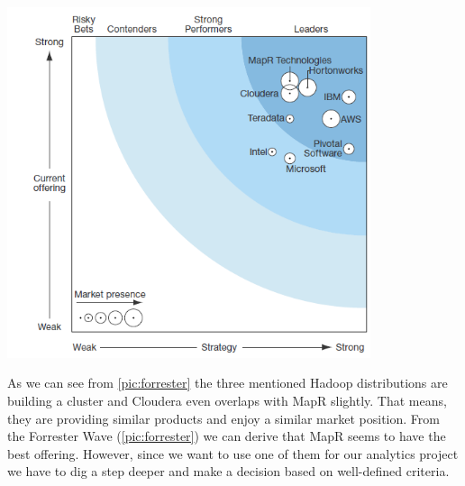 \begin{center}
\includegraphics[width=0.8\textwidth]{img/figure1}
\label{pic:forrester}
\end{center}
As we can see from 
\ref{pic:forrester} 
the three mentioned Hadoop distributions are building a cluster and Cloudera
even overlaps with MapR slightly. That means, they are providing similar products and enjoy a similar
market position. From the Forrester Wave (\ref{pic:forrester}) we can derive that MapR seems to have the best offering. However, since we want to use one of them for our analytics project we have to dig a step deeper and make a decision based on well-defined criteria.
